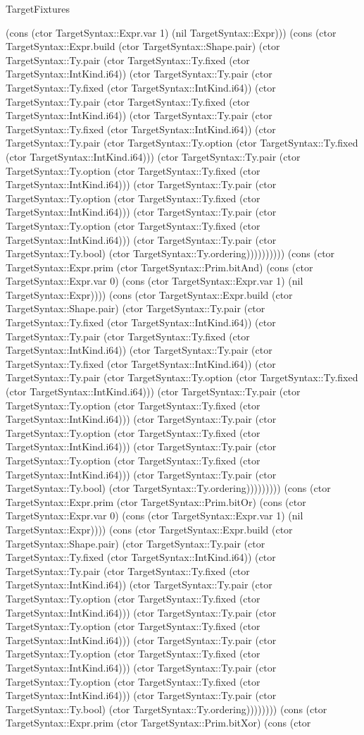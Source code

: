 \begin{lexlean}{TargetFixtures}
\begin{semanticmodule}
{(cons (ctor TargetSyntax::Expr.var 1) (nil TargetSyntax::Expr))) (cons (ctor TargetSyntax::Expr.build (ctor TargetSyntax::Shape.pair) (ctor TargetSyntax::Ty.pair (ctor TargetSyntax::Ty.fixed (ctor TargetSyntax::IntKind.i64)) (ctor TargetSyntax::Ty.pair (ctor TargetSyntax::Ty.fixed (ctor TargetSyntax::IntKind.i64)) (ctor TargetSyntax::Ty.pair (ctor TargetSyntax::Ty.fixed (ctor TargetSyntax::IntKind.i64)) (ctor TargetSyntax::Ty.pair (ctor TargetSyntax::Ty.fixed (ctor TargetSyntax::IntKind.i64)) (ctor TargetSyntax::Ty.pair (ctor TargetSyntax::Ty.option (ctor TargetSyntax::Ty.fixed (ctor TargetSyntax::IntKind.i64))) (ctor TargetSyntax::Ty.pair (ctor TargetSyntax::Ty.option (ctor TargetSyntax::Ty.fixed (ctor TargetSyntax::IntKind.i64))) (ctor TargetSyntax::Ty.pair (ctor TargetSyntax::Ty.option (ctor TargetSyntax::Ty.fixed (ctor TargetSyntax::IntKind.i64))) (ctor TargetSyntax::Ty.pair (ctor TargetSyntax::Ty.option (ctor TargetSyntax::Ty.fixed (ctor TargetSyntax::IntKind.i64))) (ctor TargetSyntax::Ty.pair (ctor TargetSyntax::Ty.bool) (ctor TargetSyntax::Ty.ordering)))))))))) (cons (ctor TargetSyntax::Expr.prim (ctor TargetSyntax::Prim.bitAnd) (cons (ctor TargetSyntax::Expr.var 0) (cons (ctor TargetSyntax::Expr.var 1) (nil TargetSyntax::Expr)))) (cons (ctor TargetSyntax::Expr.build (ctor TargetSyntax::Shape.pair) (ctor TargetSyntax::Ty.pair (ctor TargetSyntax::Ty.fixed (ctor TargetSyntax::IntKind.i64)) (ctor TargetSyntax::Ty.pair (ctor TargetSyntax::Ty.fixed (ctor TargetSyntax::IntKind.i64)) (ctor TargetSyntax::Ty.pair (ctor TargetSyntax::Ty.fixed (ctor TargetSyntax::IntKind.i64)) (ctor TargetSyntax::Ty.pair (ctor TargetSyntax::Ty.option (ctor TargetSyntax::Ty.fixed (ctor TargetSyntax::IntKind.i64))) (ctor TargetSyntax::Ty.pair (ctor TargetSyntax::Ty.option (ctor TargetSyntax::Ty.fixed (ctor TargetSyntax::IntKind.i64))) (ctor TargetSyntax::Ty.pair (ctor TargetSyntax::Ty.option (ctor TargetSyntax::Ty.fixed (ctor TargetSyntax::IntKind.i64))) (ctor TargetSyntax::Ty.pair (ctor TargetSyntax::Ty.option (ctor TargetSyntax::Ty.fixed (ctor TargetSyntax::IntKind.i64))) (ctor TargetSyntax::Ty.pair (ctor TargetSyntax::Ty.bool) (ctor TargetSyntax::Ty.ordering))))))))) (cons (ctor TargetSyntax::Expr.prim (ctor TargetSyntax::Prim.bitOr) (cons (ctor TargetSyntax::Expr.var 0) (cons (ctor TargetSyntax::Expr.var 1) (nil TargetSyntax::Expr)))) (cons (ctor TargetSyntax::Expr.build (ctor TargetSyntax::Shape.pair) (ctor TargetSyntax::Ty.pair (ctor TargetSyntax::Ty.fixed (ctor TargetSyntax::IntKind.i64)) (ctor TargetSyntax::Ty.pair (ctor TargetSyntax::Ty.fixed (ctor TargetSyntax::IntKind.i64)) (ctor TargetSyntax::Ty.pair (ctor TargetSyntax::Ty.option (ctor TargetSyntax::Ty.fixed (ctor TargetSyntax::IntKind.i64))) (ctor TargetSyntax::Ty.pair (ctor TargetSyntax::Ty.option (ctor TargetSyntax::Ty.fixed (ctor TargetSyntax::IntKind.i64))) (ctor TargetSyntax::Ty.pair (ctor TargetSyntax::Ty.option (ctor TargetSyntax::Ty.fixed (ctor TargetSyntax::IntKind.i64))) (ctor TargetSyntax::Ty.pair (ctor TargetSyntax::Ty.option (ctor TargetSyntax::Ty.fixed (ctor TargetSyntax::IntKind.i64))) (ctor TargetSyntax::Ty.pair (ctor TargetSyntax::Ty.bool) (ctor TargetSyntax::Ty.ordering)))))))) (cons (ctor TargetSyntax::Expr.prim (ctor TargetSyntax::Prim.bitXor) (cons (ctor }
\end{semanticmodule}
\end{lexlean}
